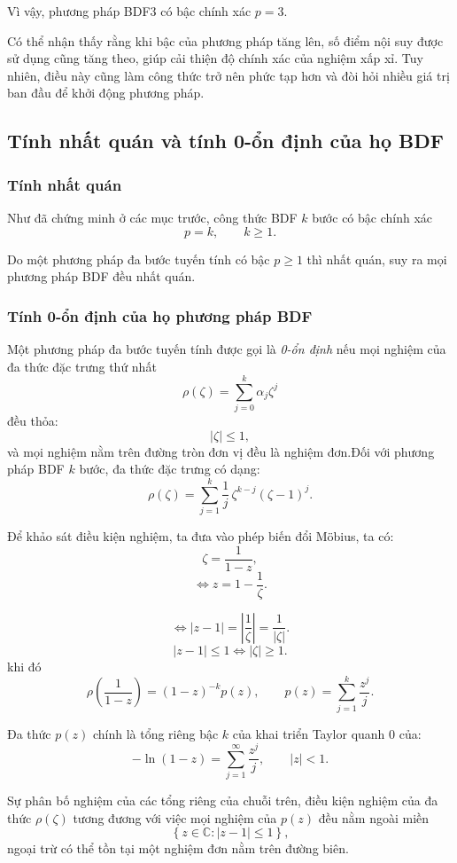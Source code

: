 Vì vậy, phương pháp BDF3 có bậc chính xác $\boxed{p=3.}$

Có thể nhận thấy rằng khi bậc của phương pháp tăng lên, số điểm nội suy được sử dụng cũng tăng theo, giúp cải thiện độ chính xác của nghiệm xấp xỉ. Tuy nhiên, điều này cũng làm công thức trở nên phức tạp hơn và đòi hỏi nhiều giá trị ban đầu để khởi động phương pháp.

\subsection{Tính nhất quán và tính 0-ổn định của họ BDF}

\subsubsection{Tính nhất quán}
Như đã chứng minh ở các mục trước, công thức BDF $k$ bước có bậc chính xác
\[
p=k,\qquad k\ge1.
\]

Do một phương pháp đa bước tuyến tính có bậc $p\ge1$ thì nhất quán, suy ra mọi phương pháp BDF đều nhất quán.
\subsubsection{Tính 0-ổn định của họ phương pháp BDF}
Một phương pháp đa bước tuyến tính được gọi là \emph{0-ổn định} nếu mọi nghiệm của đa thức đặc trưng thứ nhất
\[
\rho(\zeta)=\sum_{j=0}^{k}\alpha_j\zeta^j
\]
đều thỏa:
\[
|\zeta|\le1,
\]
và mọi nghiệm nằm trên đường tròn đơn vị đều là nghiệm đơn.Đối với phương pháp BDF $k$ bước, đa thức đặc trưng có dạng:
\[
\rho(\zeta)
=
\sum_{j=1}^{k}
\frac{1}{j}\,
\zeta^{k-j}(\zeta-1)^j.
\]

Để khảo sát điều kiện nghiệm, ta đưa vào phép biến đổi Möbius, ta có:
\[
\zeta=\frac{1}{1-z},
\]
\[
\Leftrightarrow z=1-\frac1\zeta.
\]

\[
\Leftrightarrow |z-1| =\left|\frac1\zeta\right|=\frac1{|\zeta|}.
\]
\[
|z-1|\le1\Longleftrightarrow|\zeta|\ge1.
\]
khi đó
\begin{equation}
    \rho\!\left(\frac{1}{1-z}\right) =(1-z)^{-k}p(z), \qquad p(z)=\sum_{j=1}^{k}\frac{z^j}{j}.\tag{3.1}\label{eq:3.1}
\end{equation}

Đa thức $p(z)$ chính là tổng riêng bậc $k$ của khai triển Taylor quanh $0$ của:
\[
-\ln(1-z)=\sum_{j=1}^{\infty}\frac{z^j}{j},\qquad |z|<1.
\]

Sự phân bố nghiệm của các tổng riêng của chuỗi trên, điều kiện nghiệm của đa thức $\rho(\zeta)$ tương đương với việc mọi nghiệm của $p(z)$ đều nằm ngoài miền
\[
\left\{z\in\mathbb{C}:|z-1|\le1\right\},
\]
ngoại trừ có thể tồn tại một nghiệm đơn nằm trên đường biên. 

